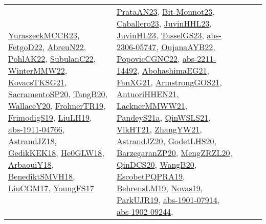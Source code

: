 {\begin{longtable}{lp{3cm}>{\raggedright}p{6cm}>{\raggedright}p{6cm}p{8cm}}
\href{articles/YuraszeckMCCR23.pdf}{YuraszeckMCCR23}\cite{YuraszeckMCCR23}, \href{articles/FetgoD22.pdf}{FetgoD22}\cite{FetgoD22}, \href{articles/AbreuN22.pdf}{AbreuN22}\cite{AbreuN22}, \href{articles/PohlAK22.pdf}{PohlAK22}\cite{PohlAK22}, \href{articles/SubulanC22.pdf}{SubulanC22}\cite{SubulanC22}, \href{papers/WinterMMW22.pdf}{WinterMMW22}\cite{WinterMMW22}, \href{papers/KovacsTKSG21.pdf}{KovacsTKSG21}\cite{KovacsTKSG21}, \href{articles/SacramentoSP20.pdf}{SacramentoSP20}\cite{SacramentoSP20}, \href{papers/TangB20.pdf}{TangB20}\cite{TangB20}, \href{articles/WallaceY20.pdf}{WallaceY20}\cite{WallaceY20}, \href{papers/FrohnerTR19.pdf}{FrohnerTR19}\cite{FrohnerTR19}, \href{papers/FrimodigS19.pdf}{FrimodigS19}\cite{FrimodigS19}, \href{papers/LiuLH19.pdf}{LiuLH19}\cite{LiuLH19}, \href{articles/abs-1911-04766.pdf}{abs-1911-04766}\cite{abs-1911-04766}, \href{papers/AstrandJZ18.pdf}{AstrandJZ18}\cite{AstrandJZ18}, \href{articles/GedikKEK18.pdf}{GedikKEK18}\cite{GedikKEK18}, \href{papers/He0GLW18.pdf}{He0GLW18}\cite{He0GLW18}, \href{papers/ArbaouiY18.pdf}{ArbaouiY18}\cite{ArbaouiY18}, \href{papers/BenediktSMVH18.pdf}{BenediktSMVH18}\cite{BenediktSMVH18}, \href{papers/LiuCGM17.pdf}{LiuCGM17}\cite{LiuCGM17}, \href{papers/YoungFS17.pdf}{YoungFS17}\cite{YoungFS17} & \href{articles/PrataAN23.pdf}{PrataAN23}\cite{PrataAN23}, \href{papers/Bit-Monnot23.pdf}{Bit-Monnot23}\cite{Bit-Monnot23}, \href{articles/Caballero23.pdf}{Caballero23}\cite{Caballero23}, \href{papers/JuvinHHL23.pdf}{JuvinHHL23}\cite{JuvinHHL23}, \href{papers/JuvinHL23.pdf}{JuvinHL23}\cite{JuvinHL23}, \href{papers/TasselGS23.pdf}{TasselGS23}\cite{TasselGS23}, \href{articles/abs-2306-05747.pdf}{abs-2306-05747}\cite{abs-2306-05747}, \href{papers/OujanaAYB22.pdf}{OujanaAYB22}\cite{OujanaAYB22}, \href{papers/PopovicCGNC22.pdf}{PopovicCGNC22}\cite{PopovicCGNC22}, \href{articles/abs-2211-14492.pdf}{abs-2211-14492}\cite{abs-2211-14492}, \href{articles/AbohashimaEG21.pdf}{AbohashimaEG21}\cite{AbohashimaEG21}, \href{articles/FanXG21.pdf}{FanXG21}\cite{FanXG21}, \href{papers/ArmstrongGOS21.pdf}{ArmstrongGOS21}\cite{ArmstrongGOS21}, \href{papers/AntuoriHHEN21.pdf}{AntuoriHHEN21}\cite{AntuoriHHEN21}, \href{papers/LacknerMMWW21.pdf}{LacknerMMWW21}\cite{LacknerMMWW21}, \href{articles/PandeyS21a.pdf}{PandeyS21a}\cite{PandeyS21a}, \href{articles/QinWSLS21.pdf}{QinWSLS21}\cite{QinWSLS21}, \href{articles/VlkHT21.pdf}{VlkHT21}\cite{VlkHT21}, \href{articles/ZhangYW21.pdf}{ZhangYW21}\cite{ZhangYW21}, \href{articles/AstrandJZ20.pdf}{AstrandJZ20}\cite{AstrandJZ20}, \href{papers/GodetLHS20.pdf}{GodetLHS20}\cite{GodetLHS20}, \href{papers/BarzegaranZP20.pdf}{BarzegaranZP20}\cite{BarzegaranZP20}, \href{articles/MengZRZL20.pdf}{MengZRZL20}\cite{MengZRZL20}, \href{articles/QinDCS20.pdf}{QinDCS20}\cite{QinDCS20}, \href{papers/WangB20.pdf}{WangB20}\cite{WangB20}, \href{articles/EscobetPQPRA19.pdf}{EscobetPQPRA19}\cite{EscobetPQPRA19}, \href{papers/BehrensLM19.pdf}{BehrensLM19}\cite{BehrensLM19}, \href{articles/Novas19.pdf}{Novas19}\cite{Novas19}, \href{papers/ParkUJR19.pdf}{ParkUJR19}\cite{ParkUJR19}, \href{articles/abs-1901-07914.pdf}{abs-1901-07914}\cite{abs-1901-07914}, \href{articles/abs-1902-09244.pdf}{abs-1902-09244}\cite{abs-1902-09244}, 
\end{longtable}}
